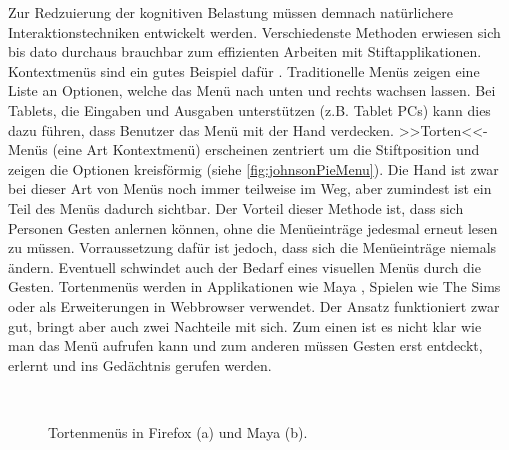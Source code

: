 \medskip Zur Redzuierung der kognitiven Belastung müssen demnach natürlichere Interaktionstechniken entwickelt werden. Verschiedenste Methoden erwiesen sich bis dato durchaus brauchbar zum effizienten Arbeiten mit Stiftapplikationen. Kontextmenüs sind ein gutes Beispiel dafür \citep{Kurtenbach:1991}. Traditionelle Menüs zeigen eine Liste an Optionen, welche das Menü nach unten und rechts wachsen lassen. Bei Tablets, die Eingaben und Ausgaben unterstützen (z.B. Tablet PCs) kann dies dazu führen, dass Benutzer das Menü mit der Hand verdecken. >>Torten<<-Menüs (eine Art Kontextmenü) erscheinen zentriert um die Stiftposition und zeigen die Optionen kreisförmig (siehe \autoref{fig:johnsonPieMenu}). Die Hand ist zwar bei dieser Art von Menüs noch immer teilweise im Weg, aber zumindest ist ein Teil des Menüs dadurch sichtbar. Der Vorteil dieser Methode ist, dass sich Personen Gesten anlernen können, ohne die Menüeinträge jedesmal erneut lesen zu müssen. Vorraussetzung dafür ist jedoch, dass sich die Menüeinträge niemals ändern. Eventuell schwindet auch der Bedarf eines visuellen Menüs durch die Gesten. Tortenmenüs werden in Applikationen wie Maya \citep{Maya:2010}, Spielen wie The Sims \citep{EA:2010} oder als Erweiterungen in Webbrowser verwendet. Der Ansatz funktioniert zwar gut, bringt aber auch zwei Nachteile mit sich. Zum einen ist es nicht klar wie man das Menü aufrufen kann und zum anderen müssen Gesten erst entdeckt, erlernt und ins Gedächtnis gerufen werden.

\begin{figure}
        \myfloatalign
         \quad
         \\
        \caption[Tortenmenüs \newline \citep{Johnson:2009}]{Tortenmenüs in Firefox (a) und Maya (b).}\label{fig:johnsonPieMenu}
\end{figure}

